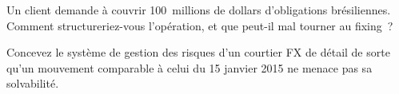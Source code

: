 \begin{interviewq}\label{iq:m2:emerging-market-fx-and-ndfs:5}
Un client demande à couvrir 100~millions de dollars d'obligations brésiliennes. Comment structureriez-vous
l'opération, et que peut-il mal tourner au fixing~?
\end{interviewq}

\begin{interviewq}\label{iq:m2:emerging-market-fx-and-ndfs:6}
Concevez le système de gestion des risques d'un courtier FX de détail de sorte qu'un mouvement comparable à celui du 15
janvier 2015 ne menace pas sa solvabilité.
\end{interviewq}
